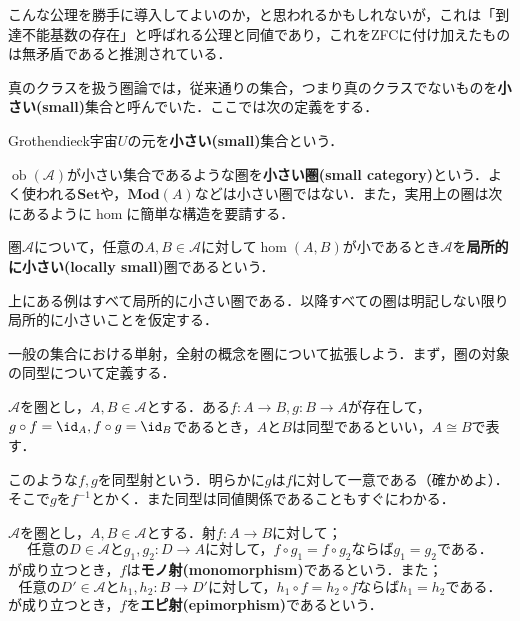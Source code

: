 \begin{tightcurve}
こんな公理を勝手に導入してよいのか，と思われるかもしれないが，これは「到達不能基数の存在」と呼ばれる公理と同値であり，これをZFCに付け加えたものは無矛盾であると推測されている．

真のクラスを扱う圏論では，従来通りの集合，つまり真のクラスでないものを\textbf{小さい(small)}集合と呼んでいた．ここでは次の定義をする．

\begin{defi}
	Grothendieck宇宙$U$の元を\textbf{小さい(small)}集合という．
\end{defi}

$\operatorname{ob}(\mathscr{A})$が小さい集合であるような圏を\textbf{小さい圏(small category)}という．よく使われる$\mathbf{Set}$や，$\mathbf{Mod}(A)$などは小さい圏ではない．また，実用上の圏は次にあるように$\hom$に簡単な構造を要請する．

\begin{defi}
	圏$\mathscr{A}$について，任意の$A,B\in\mathscr{A}$に対して$\hom(A,B)$が小であるとき$\mathscr{A}$を\textbf{局所的に小さい(locally small)}圏であるという．
\end{defi}

上にある例はすべて局所的に小さい圏である．以降すべての圏は明記しない限り局所的に小さいことを仮定する．
\end{tightcurve}

一般の集合における単射，全射の概念を圏について拡張しよう．まず，圏の対象の同型について定義する．

\begin{defi}[同型]
	$\mathscr{A}$を圏とし，$A,B\in\mathscr{A}$とする．ある$f:A\to B,g:B\to A$が存在して，$g\circ f=\id_A,f\circ g=\id_B$であるとき，$A$と$B$は同型であるといい，$A\cong B$で表す．
\end{defi}

このような$f,g$を同型射という．明らかに$g$は$f$に対して一意である（確かめよ）．そこで$g$を$f^{-1}$とかく．また同型は同値関係であることもすぐにわかる．

\begin{defi}
	$\mathscr{A}$を圏とし，$A,B\in\mathscr{A}$とする．射$f:A\to B$に対して；
	\[\text{任意の$D\in\mathscr{A}$と$g_1,g_2:D\to A$に対して，$f\circ g_1=f\circ g_2$ならば$g_1=g_2$である．}\]
	が成り立つとき，$f$は\textbf{モノ射(monomorphism)}であるという．また；
	\[\text{任意の$D'\in\mathscr{A}$と$h_1,h_2:B\to D'$に対して，$h_1\circ f=h_2\circ f$ならば$h_1=h_2$である．}\]
	が成り立つとき，$f$を\textbf{エピ射(epimorphism)}であるという．
\end{defi}


